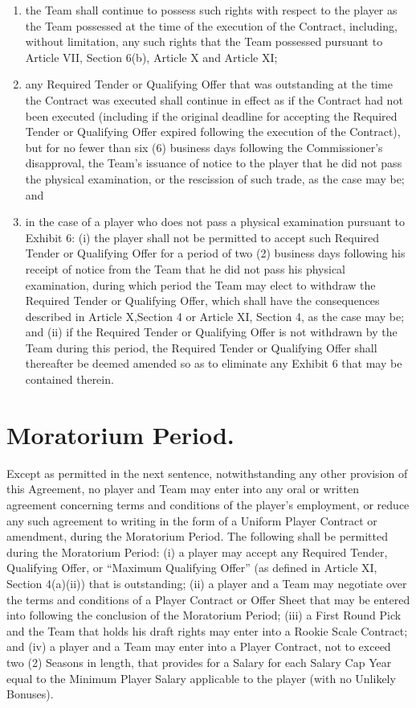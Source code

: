 \documentclass[
]{book}
\providecommand{\tightlist}{%
  \setlength{\itemsep}{0pt}\setlength{\parskip}{0pt}}
\begin{document}
\begin{enumerate}
\def\labelenumi{(\alph{enumi})}
\tightlist
\item
  the Team shall continue to possess such rights with respect to the player as the Team possessed at the time of the execution of the Contract, including, without limitation, any such rights that the Team possessed pursuant to Article VII, Section 6(b), Article X and Article XI;
\item
  any Required Tender or Qualifying Offer that was outstanding at the time the Contract was executed shall continue in effect as if the Contract had not been executed (including if the original deadline for accepting the Required Tender or Qualifying Offer expired following the execution of the Contract), but for no fewer than six (6) business days following the Commissioner's disapproval, the Team's issuance of notice to the player that he did not pass the physical examination, or the rescission of such trade, as the case may be; and
\item
  in the case of a player who does not pass a physical examination pursuant to Exhibit 6: (i) the player shall not be permitted to accept such Required Tender or Qualifying Offer for a period of two (2) business days following his receipt of notice from the Team that he did not pass his physical examination, during which period the Team may elect to withdraw the Required Tender or Qualifying Offer, which shall have the consequences described in Article X,Section 4 or Article XI, Section 4, as the case may be; and (ii) if the Required Tender or Qualifying Offer is not withdrawn by the Team during this period, the Required Tender or Qualifying Offer shall thereafter be deemed amended so as to eliminate any Exhibit 6 that may be contained therein.
\end{enumerate}

\hypertarget{moratorium-period.}{%
\section{Moratorium Period.}\label{moratorium-period.}}

Except as permitted in the next sentence, notwithstanding any other provision of this Agreement, no player and Team may enter into any oral or written agreement concerning terms and conditions of the player's employment, or reduce any such agreement to writing in the form of a Uniform Player Contract or amendment, during the Moratorium Period. The following shall be permitted during the Moratorium Period: (i) a player may accept any Required Tender, Qualifying Offer, or ``Maximum Qualifying Offer'' (as defined in Article XI, Section 4(a)(ii)) that is outstanding; (ii) a player and a Team may negotiate over the terms and conditions of a Player Contract or Offer Sheet that may be entered into following the conclusion of the Moratorium Period; (iii) a First Round Pick and the Team that holds his draft rights may enter into a Rookie Scale Contract; and (iv) a player and a Team may enter into a Player Contract, not to exceed two (2) Seasons in length, that provides for a Salary for each Salary Cap Year equal to the Minimum Player Salary applicable to the player (with no Unlikely Bonuses).
\end{document}

